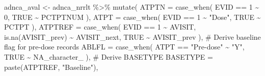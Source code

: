 \documentclass[
  letterpaper,
  DIV=11,
  numbers=noendperiod]{scrreprt}
\newenvironment{Shaded}{\begin{snugshade}}{\end{snugshade}}
\newcommand{\AttributeTok}[1]{\textcolor[rgb]{0.40,0.45,0.13}{#1}}
\newcommand{\CommentTok}[1]{\textcolor[rgb]{0.37,0.37,0.37}{#1}}
\newcommand{\ConstantTok}[1]{\textcolor[rgb]{0.56,0.35,0.01}{#1}}
\newcommand{\DecValTok}[1]{\textcolor[rgb]{0.68,0.00,0.00}{#1}}
\newcommand{\FunctionTok}[1]{\textcolor[rgb]{0.28,0.35,0.67}{#1}}
\newcommand{\NormalTok}[1]{\textcolor[rgb]{0.00,0.23,0.31}{#1}}
\newcommand{\OtherTok}[1]{\textcolor[rgb]{0.00,0.23,0.31}{#1}}
\newcommand{\SpecialCharTok}[1]{\textcolor[rgb]{0.37,0.37,0.37}{#1}}
\newcommand{\StringTok}[1]{\textcolor[rgb]{0.13,0.47,0.30}{#1}}
\begin{document}
\begin{Shaded}
\begin{Highlighting}[]
\NormalTok{adnca\_aval }\OtherTok{\textless{}{-}}\NormalTok{ adnca\_nrrlt }\SpecialCharTok{\%\textgreater{}\%}
  \FunctionTok{mutate}\NormalTok{(}
    \AttributeTok{ATPTN =} \FunctionTok{case\_when}\NormalTok{(}
\NormalTok{      EVID }\SpecialCharTok{==} \DecValTok{1} \SpecialCharTok{\textasciitilde{}} \DecValTok{0}\NormalTok{,}
      \ConstantTok{TRUE} \SpecialCharTok{\textasciitilde{}}\NormalTok{ PCTPTNUM}
\NormalTok{    ),}
    \AttributeTok{ATPT =} \FunctionTok{case\_when}\NormalTok{(}
\NormalTok{      EVID }\SpecialCharTok{==} \DecValTok{1} \SpecialCharTok{\textasciitilde{}} \StringTok{"Dose"}\NormalTok{,}
      \ConstantTok{TRUE} \SpecialCharTok{\textasciitilde{}}\NormalTok{ PCTPT}
\NormalTok{    ),}
    \AttributeTok{ATPTREF =} \FunctionTok{case\_when}\NormalTok{(}
\NormalTok{      EVID }\SpecialCharTok{==} \DecValTok{1} \SpecialCharTok{\textasciitilde{}}\NormalTok{ AVISIT,}
      \FunctionTok{is.na}\NormalTok{(AVISIT\_prev) }\SpecialCharTok{\textasciitilde{}}\NormalTok{ AVISIT\_next,}
      \ConstantTok{TRUE} \SpecialCharTok{\textasciitilde{}}\NormalTok{ AVISIT\_prev}
\NormalTok{    ),}
    \CommentTok{\# Derive baseline flag for pre{-}dose records}
    \AttributeTok{ABLFL =} \FunctionTok{case\_when}\NormalTok{(}
\NormalTok{      ATPT }\SpecialCharTok{==} \StringTok{"Pre{-}dose"} \SpecialCharTok{\textasciitilde{}} \StringTok{"Y"}\NormalTok{,}
      \ConstantTok{TRUE} \SpecialCharTok{\textasciitilde{}} \ConstantTok{NA\_character\_}
\NormalTok{    ),}
    \CommentTok{\# Derive BASETYPE}
    \AttributeTok{BASETYPE =} \FunctionTok{paste}\NormalTok{(ATPTREF, }\StringTok{"Baseline"}\NormalTok{),}


\end{Highlighting}
\end{Shaded}
\end{document}
